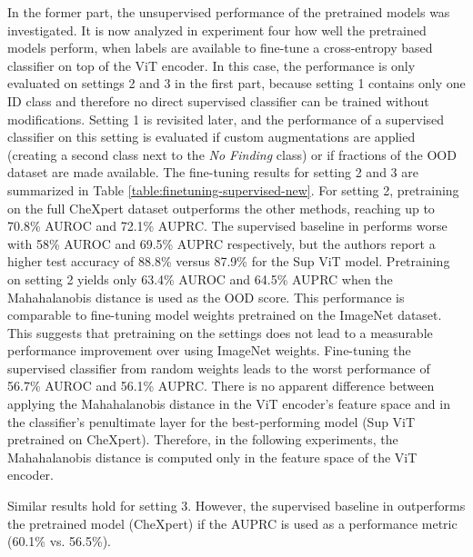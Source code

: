 \par
In the former part, the unsupervised performance of the pretrained models was investigated.
It is now analyzed in experiment four how well the pretrained models perform, when labels are available to fine-tune a cross-entropy based classifier on top of the ViT encoder.
In this case, the performance is only evaluated on settings 2 and 3 in the first part, because setting 1 contains only one ID class and therefore no direct supervised classifier can be trained without modifications.
Setting 1 is revisited later, and the performance of a supervised classifier on this setting is evaluated if custom augmentations are applied (creating a second class next to the \textit{No Finding} class) or if fractions of the OOD dataset are made available.
The fine-tuning results for setting 2 and 3 are summarized in Table \ref{table:finetuning-supervised-new}.
For setting 2, pretraining on the full CheXpert dataset outperforms the other methods, reaching up to 70.8\% AUROC and 72.1\% AUPRC.
The supervised baseline in \citep{Berger2021} performs worse with 58\% AUROC and 69.5\% AUPRC respectively, but the authors report a higher test accuracy of 88.8\% versus 87.9\% for the Sup ViT model.
Pretraining on setting 2 yields only 63.4\% AUROC and 64.5\% AUPRC when the Mahahalanobis distance is used as the OOD score.
This performance is comparable to fine-tuning model weights pretrained on the ImageNet dataset.
This suggests that pretraining on the settings does not lead to a measurable performance improvement over using ImageNet weights.
Fine-tuning the supervised classifier from random weights leads to the worst performance of 56.7\% AUROC and 56.1\% AUPRC.
There is no apparent difference between applying the Mahahalanobis distance in the ViT encoder's feature space and in the classifier's penultimate layer for the best-performing model (Sup ViT pretrained on CheXpert).
Therefore, in the following experiments, the Mahahalanobis distance is computed only in the feature space of the ViT encoder.
\par
Similar results hold for setting 3. 
However, the supervised baseline in \citep{Berger2021} outperforms the pretrained model (CheXpert) if the AUPRC is used as a performance metric (60.1\% vs. 56.5\%).
